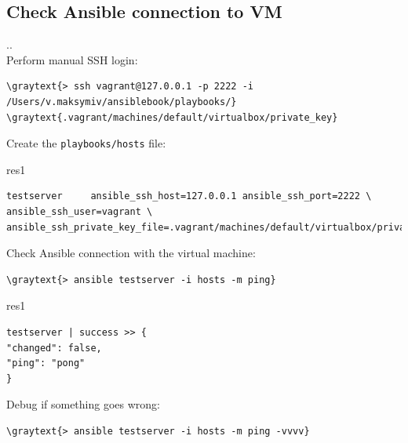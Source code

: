 \documentclass[pdf, 8pt, unicode, t]{beamer} %
\newcommand{\graytext}[1]{{\usebeamercolor[fg]{graytext_color}#1}}
\newcommand{\myinsertsubsection}{\alert{\Large\insertsectionnumber.\insertsubsectionnumber. \insertsubsection}\\}
\begin{document}
\subsection{Check Ansible connection to VM}
\begin{frame}[fragile]
\myinsertsubsection

\vspace{1.5em}
Perform manual SSH login:
\begin{Verbatim}[commandchars=\\\{\}]
\graytext{> ssh vagrant@127.0.0.1 -p 2222 -i /Users/v.maksymiv/ansiblebook/playbooks/}
\graytext{.vagrant/machines/default/virtualbox/private_key}
\end{Verbatim}
\vspace{1.5em}
Create the \verb|playbooks/hosts| file:

\hspace{1em}
\begin{beamercolorbox}[wd=0.85\textwidth,sep=-0.5em,rounded=true,shadow=true,center]{res1}
\small
\begin{Verbatim}
testserver     ansible_ssh_host=127.0.0.1 ansible_ssh_port=2222 \
ansible_ssh_user=vagrant \
ansible_ssh_private_key_file=.vagrant/machines/default/virtualbox/private_key
\end{Verbatim}
\end{beamercolorbox}

\vspace{1.5em}
\normalsize
Check Ansible connection with the virtual machine:
\begin{Verbatim}[commandchars=\\\{\}]
\graytext{> ansible testserver -i hosts -m ping}
\end{Verbatim}

\hspace{1em}
\begin{beamercolorbox}[wd=0.32\textwidth,sep=-0.5em,rounded=true,shadow=true,center]{res1}
\small
\begin{Verbatim}
testserver | success >> {
"changed": false,
"ping": "pong"
}
\end{Verbatim}
\end{beamercolorbox}

\vspace{1.5em}
\normalsize
Debug if something goes wrong:
\begin{Verbatim}[commandchars=\\\{\}]
\graytext{> ansible testserver -i hosts -m ping -vvvv}
\end{Verbatim}
\end{frame}
\end{document}

